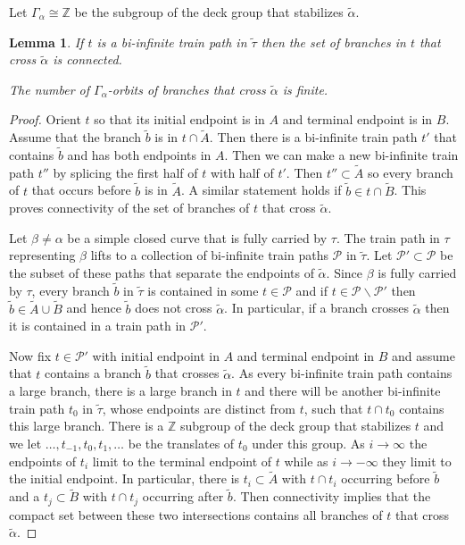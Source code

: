 \documentclass[11pt]{article}
\newtheorem{lemma}[thm]{Lemma}
\theoremstyle{remark}
\def\Z{{\mathbb Z}}
\newcommand{\cP}{{\mathcal P}}
\begin{document}
Let $\Gamma_\alpha \cong \Z$ be the subgroup of the deck group that stabilizes $\tilde\alpha$.

\begin{lemma}\label{connected}
If $t$ is a bi-infinite train path in $\tilde\tau$ then the set of branches in $t$ that cross $\tilde\alpha$ is connected.

The number of $\Gamma_\alpha$-orbits of branches that cross $\tilde\alpha$ is finite.
\end{lemma}



\begin{proof} 
Orient $t$ so that its initial endpoint is in $A$ and terminal endpoint is in $B$.
Assume that the branch $\tilde b$ is in $t \cap\tilde{A}$. Then there is a bi-infinite train path $t'$ that contains $\tilde b$ and has both endpoints in $A$. Then we can make a new bi-infinite train path $t''$ by splicing the first half of $t$ with half of $t'$. Then $t'' \subset \tilde{A}$ so every branch of $t$ that occurs before $\tilde b$ is in $\tilde{A}$. A similar statement holds if $\tilde b \in t \cap \tilde{B}$. This proves connectivity of the set of branches of $t$ that cross $\tilde \alpha$.

Let $\beta \neq \alpha$ be a simple closed curve that is fully carried by $\tau$. The train path in $\tau$ representing $\beta$ lifts to a collection of bi-infinite train paths $\cP$ in $\tilde\tau$. Let $\cP' \subset \cP$ be the subset of these paths that separate the endpoints of $\tilde\alpha$. Since $\beta$ is fully carried by $\tau$, every branch $\tilde b$ in $\tilde\tau$ is contained in some $t \in \cP$ and if $t \in \cP\smallsetminus \cP'$ then $\tilde b \in \tilde{A} \cup\tilde{B}$ and hence $\tilde b$ does not cross $\tilde\alpha$. In particular, if a branch crosses $\tilde\alpha$ then it is contained in a train path in $\cP'$.

Now fix $t \in \cP'$ with initial endpoint in $A$ and terminal endpoint in $B$ and assume that $t$ contains a branch $\tilde b$ that crosses $\tilde\alpha$.
As every bi-infinite train path contains a large branch,
there is a large branch in $t$ and there will be another bi-infinite train path $t_0$ in $\tilde\tau$, whose endpoints are distinct from $t$, such that $t\cap t_0$ contains this large branch.
 There is a $\Z$ subgroup of the deck group that stabilizes $t$ and we let $\dots, t_{-1}, t_0, t_1, \dots$ be the translates of $t_0$ under this group.
As $i\to\infty$ the endpoints of $t_i$ limit to the terminal endpoint of $t$ while as $i\to-\infty$ they limit to the initial endpoint. In particular, there is $t_i \subset \tilde{A}$ with $t \cap t_i$ occurring before $\tilde b$ and a $t_j\subset \tilde{B}$ with $t\cap t_j$ occurring after $\tilde b$. Then connectivity implies that the compact set between these two intersections contains all branches of $t$ that  cross $\tilde\alpha$.


\end{proof}
\end{document}
